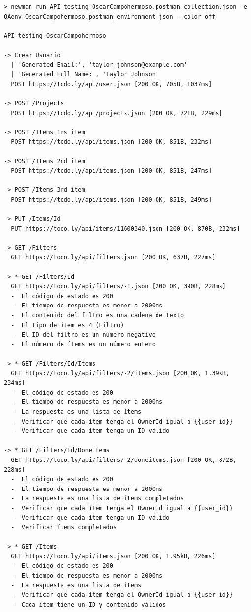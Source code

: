 \documentclass{report}
\begin{document}
\begin{verbatim}
> newman run API-testing-OscarCampohermoso.postman_collection.json -e 
QAenv-OscarCampohermoso.postman_environment.json --color off

API-testing-OscarCampohermoso

-> Crear Usuario
  | 'Generated Email:', 'taylor_johnson@example.com'
  | 'Generated Full Name:', 'Taylor Johnson'
  POST https://todo.ly/api/user.json [200 OK, 705B, 1037ms]

-> POST /Projects
  POST https://todo.ly/api/projects.json [200 OK, 721B, 229ms]

-> POST /Items 1rs item
  POST https://todo.ly/api/items.json [200 OK, 851B, 232ms]

-> POST /Items 2nd item
  POST https://todo.ly/api/items.json [200 OK, 851B, 247ms]

-> POST /Items 3rd item
  POST https://todo.ly/api/items.json [200 OK, 851B, 249ms]

-> PUT /Items/Id
  PUT https://todo.ly/api/items/11600340.json [200 OK, 870B, 232ms]

-> GET /Filters
  GET https://todo.ly/api/filters.json [200 OK, 637B, 227ms]

-> * GET /Filters/Id
  GET https://todo.ly/api/filters/-1.json [200 OK, 390B, 228ms]
  -  El código de estado es 200
  -  El tiempo de respuesta es menor a 2000ms
  -  El contenido del filtro es una cadena de texto
  -  El tipo de ítem es 4 (Filtro)
  -  El ID del filtro es un número negativo
  -  El número de ítems es un número entero

-> * GET /Filters/Id/Items
  GET https://todo.ly/api/filters/-2/items.json [200 OK, 1.39kB, 234ms]
  -  El código de estado es 200
  -  El tiempo de respuesta es menor a 2000ms
  -  La respuesta es una lista de ítems
  -  Verificar que cada ítem tenga el OwnerId igual a {{user_id}}
  -  Verificar que cada ítem tenga un ID válido

-> * GET /Filters/Id/DoneItems
  GET https://todo.ly/api/filters/-2/doneitems.json [200 OK, 872B, 228ms]
  -  El código de estado es 200
  -  El tiempo de respuesta es menor a 2000ms
  -  La respuesta es una lista de ítems completados
  -  Verificar que cada ítem tenga el OwnerId igual a {{user_id}}
  -  Verificar que cada ítem tenga un ID válido
  -  Verificar ítems completados

-> * GET /Items
  GET https://todo.ly/api/items.json [200 OK, 1.95kB, 226ms]
  -  El código de estado es 200
  -  El tiempo de respuesta es menor a 2000ms
  -  La respuesta es una lista de ítems
  -  Verificar que cada ítem tenga el OwnerId igual a {{user_id}}
  -  Cada ítem tiene un ID y contenido válidos
\end{verbatim}
\end{document}
